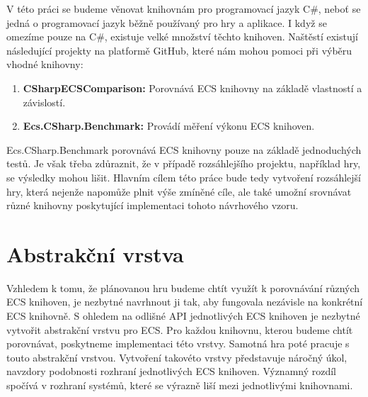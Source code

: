 V této práci se budeme věnovat knihovnám pro programovací jazyk C\#, neboť se jedná o programovací jazyk běžně používaný pro hry a aplikace. I když se omezíme pouze na C\#, existuje velké množství těchto knihoven. Naštěstí existují následující projekty na platformě GitHub, které nám mohou pomoci při výběru vhodné knihovny:

\begin{enumerate}
    \item \textbf{CSharpECSComparison:} Porovnává ECS knihovny na základě vlastností a závislostí.
    \item \textbf{Ecs.CSharp.Benchmark:} Provádí měření výkonu ECS knihoven.
\end{enumerate}
Ecs.CSharp.Benchmark porovnává ECS knihovny pouze na základě jednoduchých testů. Je však třeba zdůraznit, že v případě rozsáhlejšího projektu, například hry, se výsledky mohou lišit. Hlavním cílem této práce bude tedy vytvoření rozsáhlejší hry, která nejenže napomůže plnit výše zmíněné cíle, ale také umožní srovnávat různé knihovny poskytující implementaci tohoto návrhového vzoru.

\section{Abstrakční vrstva}
Vzhledem k tomu, že plánovanou hru budeme chtít využít k porovnávání různých ECS knihoven, je nezbytné navrhnout ji tak, aby fungovala nezávisle na konkrétní ECS knihovně. S ohledem na odlišné API jednotlivých ECS knihoven je nezbytné vytvořit abstrakční vrstvu pro ECS. Pro každou knihovnu, kterou budeme chtít porovnávat, poskytneme implementaci této vrstvy. Samotná hra poté pracuje s touto abstrakční vrstvou. Vytvoření takovéto vrstvy představuje náročný úkol, navzdory podobnosti rozhraní jednotlivých ECS knihoven. Významný rozdíl spočívá v rozhraní systémů, které se výrazně liší mezi jednotlivými knihovnami.

